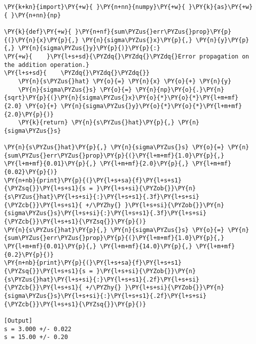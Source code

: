 \begin{Verbatim}[label=\makebox{\href{https://github.com/unipi-physics-labs/statnotes/tree/main/snippy/func_def.py}{https://github.com/.../func\_def.py}},commandchars=\\\{\}]
\PY{k+kn}{import}\PY{+w}{ }\PY{n+nn}{numpy}\PY{+w}{ }\PY{k}{as}\PY{+w}{ }\PY{n+nn}{np}

\PY{k}{def}\PY{+w}{ }\PY{n+nf}{sum\PYZus{}err\PYZus{}prop}\PY{p}{(}\PY{n}{x}\PY{p}{,} \PY{n}{sigma\PYZus{}x}\PY{p}{,} \PY{n}{y}\PY{p}{,} \PY{n}{sigma\PYZus{}y}\PY{p}{)}\PY{p}{:}
\PY{+w}{    }\PY{l+s+sd}{\PYZdq{}\PYZdq{}\PYZdq{}Error propagation on the addition operation.}
\PY{l+s+sd}{    \PYZdq{}\PYZdq{}\PYZdq{}}
    \PY{n}{s\PYZus{}hat} \PY{o}{=} \PY{n}{x} \PY{o}{+} \PY{n}{y}
    \PY{n}{sigma\PYZus{}s} \PY{o}{=} \PY{n}{np}\PY{o}{.}\PY{n}{sqrt}\PY{p}{(}\PY{n}{sigma\PYZus{}x}\PY{o}{*}\PY{o}{*}\PY{l+m+mf}{2.0} \PY{o}{+} \PY{n}{sigma\PYZus{}y}\PY{o}{*}\PY{o}{*}\PY{l+m+mf}{2.0}\PY{p}{)}
    \PY{k}{return} \PY{n}{s\PYZus{}hat}\PY{p}{,} \PY{n}{sigma\PYZus{}s}

\PY{n}{s\PYZus{}hat}\PY{p}{,} \PY{n}{sigma\PYZus{}s} \PY{o}{=} \PY{n}{sum\PYZus{}err\PYZus{}prop}\PY{p}{(}\PY{l+m+mf}{1.0}\PY{p}{,} \PY{l+m+mf}{0.01}\PY{p}{,} \PY{l+m+mf}{2.0}\PY{p}{,} \PY{l+m+mf}{0.02}\PY{p}{)}
\PY{n+nb}{print}\PY{p}{(}\PY{l+s+sa}{f}\PY{l+s+s1}{\PYZsq{}}\PY{l+s+s1}{s = }\PY{l+s+si}{\PYZob{}}\PY{n}{s\PYZus{}hat}\PY{l+s+si}{:}\PY{l+s+s1}{.3f}\PY{l+s+si}{\PYZcb{}}\PY{l+s+s1}{ +/\PYZhy{} }\PY{l+s+si}{\PYZob{}}\PY{n}{sigma\PYZus{}s}\PY{l+s+si}{:}\PY{l+s+s1}{.3f}\PY{l+s+si}{\PYZcb{}}\PY{l+s+s1}{\PYZsq{}}\PY{p}{)}
\PY{n}{s\PYZus{}hat}\PY{p}{,} \PY{n}{sigma\PYZus{}s} \PY{o}{=} \PY{n}{sum\PYZus{}err\PYZus{}prop}\PY{p}{(}\PY{l+m+mf}{1.0}\PY{p}{,} \PY{l+m+mf}{0.01}\PY{p}{,} \PY{l+m+mf}{14.0}\PY{p}{,} \PY{l+m+mf}{0.2}\PY{p}{)}
\PY{n+nb}{print}\PY{p}{(}\PY{l+s+sa}{f}\PY{l+s+s1}{\PYZsq{}}\PY{l+s+s1}{s = }\PY{l+s+si}{\PYZob{}}\PY{n}{s\PYZus{}hat}\PY{l+s+si}{:}\PY{l+s+s1}{.2f}\PY{l+s+si}{\PYZcb{}}\PY{l+s+s1}{ +/\PYZhy{} }\PY{l+s+si}{\PYZob{}}\PY{n}{sigma\PYZus{}s}\PY{l+s+si}{:}\PY{l+s+s1}{.2f}\PY{l+s+si}{\PYZcb{}}\PY{l+s+s1}{\PYZsq{}}\PY{p}{)}

[Output]
s = 3.000 +/- 0.022
s = 15.00 +/- 0.20
\end{Verbatim}
